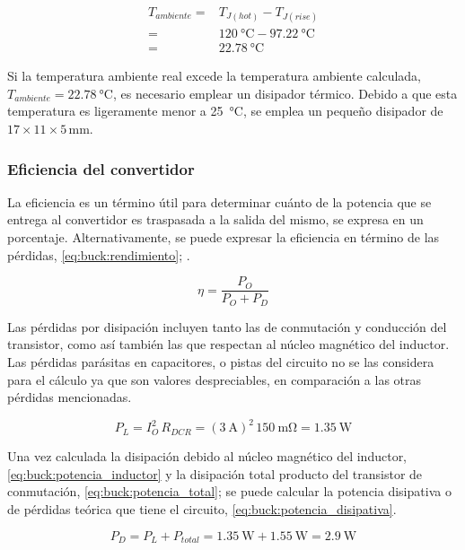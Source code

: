 \begin{align} \label{eq:buck:temperatura_ambiente}
    T_{ambiente} =& T_{J(hot)} - T_{J(rise)} \\
    =& \SI{120}{\celsius} - \SI{97.22}{\celsius} \nonumber \\
    =& \SI{22.78}{\celsius} \nonumber
\end{align}

Si la temperatura ambiente real excede la temperatura ambiente calculada, $T_{ambiente} = \SI{22.78}{\degreeCelsius}$, es necesario emplear un disipador térmico. Debido a que esta temperatura es ligeramente menor a \SI{25}{\degreeCelsius}, se emplea un pequeño disipador de $17\times11\times5 \, \unit{\milli\meter}$.

\subsubsection{Eficiencia del convertidor}

La eficiencia es un término útil para determinar cuánto de la potencia que se entrega al convertidor es traspasada a la salida del mismo, se expresa en un porcentaje. Alternativamente, se puede expresar la eficiencia en término de las pérdidas, \cref{eq:buck:rendimiento}; \parencite{ti-eficiencia}.

\begin{equation} \label{eq:buck:rendimiento}
    \eta = \frac{P_O}{P_O + P_D}  
\end{equation}

Las pérdidas por disipación incluyen tanto las de conmutación y conducción del transistor, como así también las que respectan al núcleo magnético del inductor. Las pérdidas parásitas en capacitores, o pistas del circuito no se las considera para el cálculo ya que son valores despreciables, en comparación a las otras pérdidas mencionadas.

\begin{equation} \label{eq:buck:potencia_inductor}
    P_L = I_O^2 \, R_{DCR} = (\SI{3}{\ampere})^2 \, \SI{150}{\milli\ohm} = \SI{1.35}{\watt}
\end{equation}

Una vez calculada la disipación debido al núcleo magnético del inductor, \cref{eq:buck:potencia_inductor} y la disipación total producto del transistor de conmutación, \cref{eq:buck:potencia_total}; se puede calcular la potencia disipativa o de pérdidas teórica que tiene el circuito, \cref{eq:buck:potencia_disipativa}.

\begin{equation} \label{eq:buck:potencia_disipativa}
    P_D = P_L + P_{total} = \SI{1.35}{\watt} + \SI{1.55}{\watt} = \SI{2.9}{\watt}
\end{equation}


